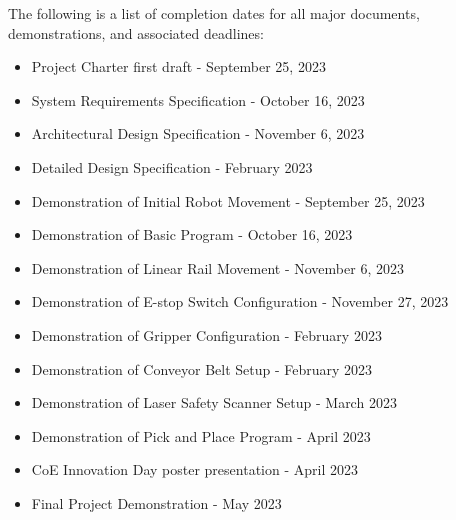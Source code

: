The following is a list of completion dates for all major documents, demonstrations, and associated deadlines:
\begin{itemize}
  \item Project Charter first draft - September 25, 2023
  \item System Requirements Specification - October 16, 2023
  \item Architectural Design Specification - November 6, 2023
  \item Detailed Design Specification - February 2023
  \item Demonstration of Initial Robot Movement - September 25, 2023
  \item Demonstration of Basic Program - October 16, 2023
  \item Demonstration of Linear Rail Movement - November 6, 2023
  \item Demonstration of E-stop Switch Configuration - November 27, 2023
  \item Demonstration of Gripper Configuration - February 2023
  \item Demonstration of Conveyor Belt Setup - February 2023
  \item Demonstration of Laser Safety Scanner Setup - March 2023
  \item Demonstration of Pick and Place Program - April 2023
  \item CoE Innovation Day poster presentation - April 2023
  \item Final Project Demonstration - May 2023
\end{itemize}